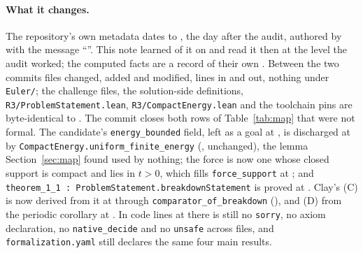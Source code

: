 \documentclass[11pt]{article}
\newcommand{\lean}[1]{\texttt{#1}}
\begin{document}
{\sloppy\paragraph{What it changes.} The repository's own metadata dates \lean{\UpCommit} to
\UpCommitDate{} \UpCommitTime, the day after the audit, authored by \UpAuthor{} with the
message ``\UpMessage''. This note learned of it on \UpReadOn{} and read it then at the level
the audit worked; the computed facts are a record of their own \cite{Records}. Between the two
commits \UpDiffFiles{} files changed, \UpDiffAdded{} added and \UpDiffModified{} modified,
\UpInsertions{} lines in and \UpDeletions{} out, nothing under \lean{Euler/}; the challenge
files, the solution-side definitions, \lean{R3/ProblemStatement.lean},
\lean{R3/CompactEnergy.lean} and the toolchain pins are byte-identical to \lean{\LeanCommit}.
The commit closes both rows of Table~\ref{tab:map} that were not formal. The candidate's
\lean{energy\_bounded} field, left as a goal at \lean{\UpLocEnergyHole}, is discharged at
\lean{\UpLocEnergy} by \lean{CompactEnergy.uniform\_finite\_energy} (\lean{\UpLocLemma},
unchanged), the lemma Section~\ref{sec:map} found used by nothing; the force is now one whose
closed support is compact and lies in $t>0$, which fills \lean{force\_support} at
\lean{\UpLocForce}; and \lean{theorem\_1\_1 : ProblemStatement.breakdownStatement} is proved at
\lean{\UpLocTheorem}. Clay's (C) is now derived from it at \lean{\UpLocClayC} through
\lean{comparator\_of\_breakdown} (\lean{\UpLocBridge}), and (D) from the periodic corollary at
\lean{\UpLocClayD}. In code lines at \lean{\UpCommit} there is still no \lean{sorry}, no axiom
declaration, no \lean{native\_decide} and no \lean{unsafe} across \UpFilesAtHead{} files, and
\lean{formalization.yaml} still declares the same four main results.\par}
\end{document}
